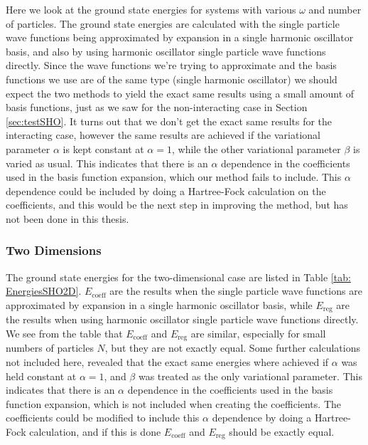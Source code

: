 \documentclass[../main.tex]{subfiles}
\begin{document}
Here we look at the ground state energies for systems with various $\omega$ and number of particles. The ground state energies are calculated with the single particle wave functions being approximated by expansion in a single harmonic oscillator basis, and also by using harmonic oscillator single particle wave functions directly. Since the wave functions we're trying to approximate and the basis functions we use are of the same type (single harmonic oscillator) we should expect the two methods to yield the exact same results using a small amount of basis functions, just as we saw for the non-interacting case in Section \ref{sec:testSHO}. It turns out that we don't get the exact same results for the interacting case, however the same results are achieved if the variational parameter $\alpha$ is kept constant at $\alpha = 1$, while the other variational parameter $\beta$ is varied as usual. This indicates that there is an $\alpha$ dependence in the coefficients used in the basis function expansion, which our method fails to include. This $\alpha$ dependence could be included by doing a Hartree-Fock calculation on the coefficients, and this would be the next step in improving the method, but has not been done in this thesis.

\subsubsection{Two Dimensions}

The ground state energies for the two-dimensional case are listed in Table \ref{tab: EnergiesSHO2D}. $E_\textrm{coeff}$ are the results when the single particle wave functions are approximated by expansion in a single harmonic oscillator basis, while $E_\textrm{reg}$ are the results when using harmonic oscillator single particle wave functions directly. We see from the table that $E_\textrm{coeff}$ and $E_\textrm{reg}$ are similar, especially for small numbers of particles $N$, but they are not exactly equal. Some further calculations not included here, revealed that the exact same energies where achieved if $\alpha$ was held constant at $\alpha = 1$, and $\beta$ was treated as the only variational parameter. This indicates that there is an $\alpha$ dependence in the coefficients used in the basis function expansion, which is not included when creating the coefficients. The coefficients could be modified to include this $\alpha$ dependence by doing a Hartree-Fock calculation, and if this is done $E_\textrm{coeff}$ and $E_\textrm{reg}$ should be exactly equal. 
\end{document}
